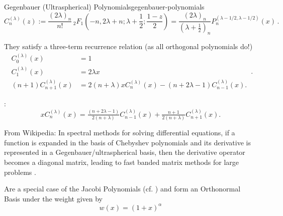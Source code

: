 \begin{definition}{Gegenbauer (Ultraspherical) Polynomials}{gegenbauer-polynomials}
  $$C_{n}^{{( \lambda )}}(z) := {\frac  {(2\lambda )_{n}}{n!}}\,_{2}F_{1}\left(-n,2\lambda +n;\lambda +{\frac  {1}{2}};{\frac  {1-z}{2}}\right) = {\frac  {(2\lambda )_{n}}{(\lambda +{\frac  {1}{2}})_{{n}}}}P_{n}^{{(\lambda -1/2,\lambda -1/2)}}(x)\,.$$
\end{definition}

They satisfy a three-term recurrence relation (as all orthogonal polynomials do!)
$${ {\begin{aligned}C_{0}^{(\lambda )}(x)&=1\\C_{1}^{(\lambda )}(x)&=2\lambda x\\(n+1)C_{n+1}^{(\lambda )}(x)&=2(n+\lambda )xC_{n}^{(\lambda )}(x)-(n+2\lambda -1)C_{n-1}^{(\lambda )}(x).\end{aligned}}}\,.$$

\cite[18.9.1]{2018-nist}:
\begin{equation}\label{eq:ultraspherical-rec}
  x C_n^{(\lambda)}(x) = \tfrac{(n+2\lambda-1)}{2(n+\lambda)}C_{n-1}^{(\lambda)}(x) + \tfrac{n+1}{2(n+\lambda)}C_{n+1}^{(\lambda)}(x).
\end{equation}

From Wikipedia: In spectral methods for solving differential equations, if a function is expanded in the basis of Chebyshev polynomials and its derivative is represented in a Gegenbauer/ultraspherical basis, then the derivative operator becomes a diagonal matrix, leading to fast banded matrix methods for large problems \parencite{2013-a-fast-and-well-conditioned-spectral-method}.

Are a special case of the Jacobi Polynomials (cf. ) and form an
Orthonormal Basis under the weight given by
$$w(x)=(1+x)^\alpha$$
